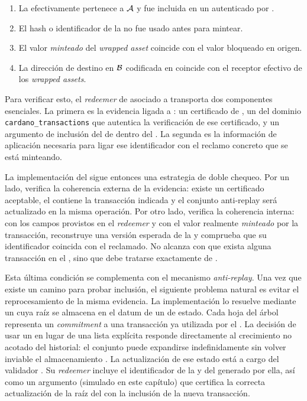 \begin{enumerate}[noitemsep]
  \item La \LockTx efectivamente pertenece a $\mathcal{A}$ y fue incluida en un \TransactionSnapshot autenticado por \Mithril.
  \item El hash o identificador de la \LockTx no fue usado antes para mintear.
  \item El valor \textit{minteado} del \textit{wrapped asset} coincide con el valor bloqueado en origen.
  \item La dirección de destino en $\mathcal{B}$ codificada en \LockTx coincide con el receptor efectivo de los \textit{wrapped assets}.
\end{enumerate}

Para verificar esto, el \textit{redeemer} de \MintTx asociado a \MintingValidator transporta dos componentes esenciales. La primera es la evidencia ligada a \Mithril: un certificado de \TransactionSnapshot, un \ProofReceipt del dominio \texttt{cardano\_transactions} que autentica la verificación \STM de ese certificado, y un argumento \Groth de inclusión del \TxId de \LockTx dentro del \TransactionSnapshot. La segunda es la información de aplicación necesaria para ligar ese identificador con el reclamo concreto que se está minteando.

La implementación del \MintingValidator sigue entonces una estrategia de doble chequeo. Por un lado, verifica la coherencia externa de la evidencia: existe un certificado aceptable, el \TransactionSnapshot contiene la transacción indicada y el conjunto anti-replay será actualizado en la misma operación. Por otro lado, verifica la coherencia interna: con los campos provistos en el \textit{redeemer} y con el valor realmente \textit{minteado} por la transacción, reconstruye una versión esperada de la \LockTx y comprueba que su identificador coincida con el reclamado. No alcanza con que exista alguna transacción en el \TransactionSnapshot, sino que debe tratarse exactamente de \LockTx.

Esta última condición se complementa con el mecanismo \textit{anti-replay}. Una vez que existe un camino para probar inclusión, el siguiente problema natural es evitar el reprocesamiento de la misma evidencia. La implementación lo resuelve mediante un \SMT cuya raíz se almacena en el datum de un \UTxO de estado. Cada hoja del árbol representa un \textit{commitment} a una transacción ya utilizada por el \zkBridge. La decisión de usar un \SMT en lugar de una lista explícita responde directamente al crecimiento no acotado del historial: el conjunto puede expandirse indefinidamente sin volver inviable el almacenamiento \Onchain. La actualización de ese estado está a cargo del validador \TxsUpdaterMintingValidator. Su \textit{redeemer} incluye el identificador de la \LockTx y del \UTxO generado por ella, así como un argumento \ZK \Groth (simulado en este capítulo) que certifica la correcta actualización de la raíz del \SMT con la inclusión de la nueva transacción.

